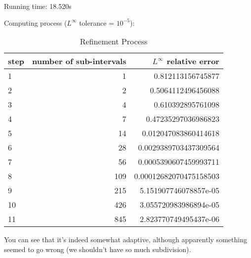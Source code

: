 \documentclass{article}
\begin{document}
Running time: 18.520s

Computing process ($L^\infty$ tolerance = $10^{-5}$):

\begin{table}[H]
    \centering
    \begin{tabular}{l|r|r}
        step & number of sub-intervals & $L^\infty$ relative error \\
        \hline
        1  &   1 & 0.812113156745877 \\
        2  &   2 & 0.5064112496456088 \\
        3  &   4 & 0.610392895761098 \\
        4  &   7 & 0.47235297036986823 \\
        5  &  14 & 0.012047083860414618 \\
        6  &  28 & 0.0029389703437309564 \\
        7  &  56 & 0.0005390607459993711 \\
        8  & 109 & 0.00012682070475158503 \\
        9  & 215 & 5.151907746078857e-05 \\
        10 & 426 & 3.055720983986894e-05 \\
        11 & 845 & 2.823770749495437e-06 \\
    \end{tabular}
    \caption{Refinement Process}
\end{table}

You can see that it's indeed somewhat adaptive, although apparently something seemed to go wrong
(we shouldn't have so much subdivision).
\end{document}
